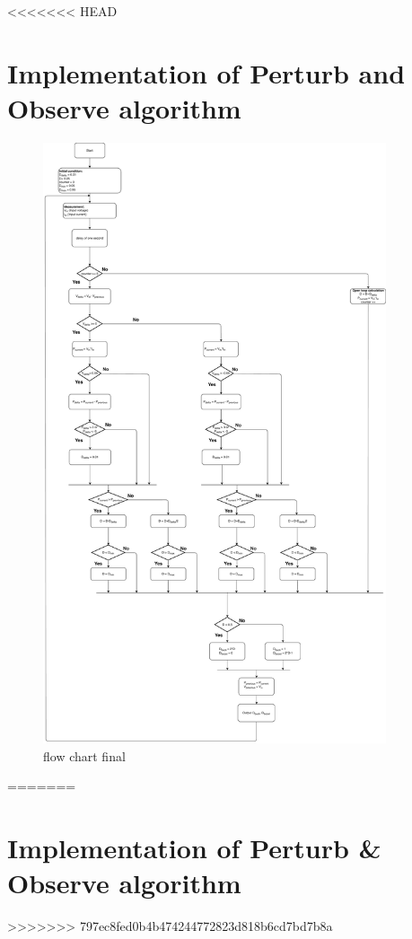 <<<<<<< HEAD
\section{Implementation of Perturb and Observe algorithm}\label{MPPTImplementation}

\begin{figure}[htbp]
	\begin{center}
		\includegraphics[width=0.9\textwidth]{../Pictures/2018_11_12_Flow_chart_MPPT_Buck-Boost_converter}
		\caption{flow chart final }
		\label{fcfinal}
	\end{center}	
\end{figure}

=======
\section{Implementation of Perturb & Observe algorithm}\label{MPPTImplementation}
>>>>>>> 797ec8fed0b4b474244772823d818b6cd7bd7b8a
